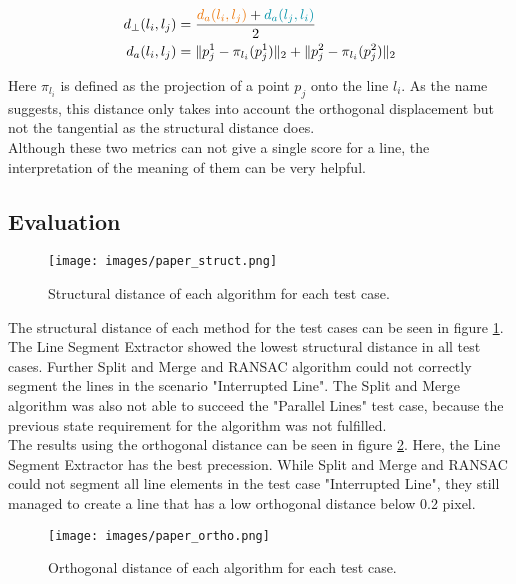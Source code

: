 \documentclass{scp}
\begin{document}
\begin{align}
    d_{\perp} (l_i, l_j) &= \frac{ \color{uzllightorange} {d_a(l_i, l_j)}  \color{black}+ \color{uzlblue} d_a(l_j, l_i) \color{black}}{2} \label{eq:ortho}\\
    d_a(l_i, l_j) &= \|p_j^1 - \pi_{l_i}(p_j^1)\|_2 + \|p_j^2 - \pi_{l_i}(p_j^2)\|_2
\end{align}

Here $\pi_{l_i}$ is defined as the projection of a point $p_j$ onto the line $l_i$. As the name suggests, this distance only takes into account the orthogonal displacement but not the tangential as the structural distance does.\\
Although these two metrics can not give a single score for a line, the interpretation of the meaning of them can be very helpful.



\subsection*{Evaluation}

\begin{figure}[b]
    \centering
    \texttt{[image: images/paper\_struct.png]}
    \caption{Structural distance of each algorithm for each test case.}
    \label{fig:struct_test}
\end{figure}

The structural distance of each method for the test cases can be seen in figure \ref{fig:struct_test}. The Line Segment Extractor showed the lowest structural distance in all test cases. Further Split and Merge and RANSAC algorithm could not correctly segment the lines in the scenario "Interrupted Line". The Split and Merge algorithm was also not able to succeed the "Parallel Lines" test case, because the previous state requirement for the algorithm was not fulfilled.\\
The results using the orthogonal distance can be seen in figure \ref{fig:ortho_test}. Here, the Line Segment Extractor has the best precession. While Split and Merge and RANSAC could not segment all line elements in the test case "Interrupted Line", they still managed to create a line that has a low orthogonal distance below 0.2 pixel. 

\begin{figure}[b]
    \centering
    \texttt{[image: images/paper\_ortho.png]}
    \caption{Orthogonal distance of each algorithm for each test case.}
    \label{fig:ortho_test}
\end{figure}
\end{document}
